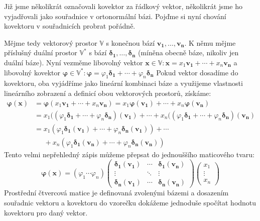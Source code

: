 \documentclass[a5paper,12pt]{amsbook}
\theoremstyle{definition}
\newcommand{\myvec}[1]{\mathbf{#1}}
\newcommand{\myspace}[1]{\mathbb{#1}}
\newcommand{\mydual}[1]{\myspace{#1^{*}}}
\begin{document}
\noindent
Již jsme několikrát označovali kovektor za řádkový vektor, několikrát jsme ho vyjadřovali jako
souřadnice v ortonormální bázi. Pojďme si nyní chování kovektoru v souřadnicích probrat pořádně.

Mějme tedy vektorový prostor $\myspace{V}$ s konečnou bází ${\myvec{v_1}, \hdots , \myvec{v_n}}$.
K němu mějme příslušný duální prostor $\mydual{V}$ s bází
${\myvec{\delta_1}, \hdots , \myvec{\delta_n}}$ (míněna obecně báze, nikoliv jen duální báze).
Nyní vezměme libovolný vektor
$\myvec{x}\in\myspace{V}: \myvec{x} = x_1\myvec{v_1} + \cdots + x_n\myvec{v_n}$
a libovolný kovektor
$\myvec{\varphi}\in\mydual{V}: \myvec{\varphi} = \varphi_1\myvec{\delta_1} + \cdots + \varphi_n\myvec{\delta_n}$
Pokud vektor dosadíme do kovektoru, oba vyjádříme jako lineární kombinaci báze a využijeme
vlastnosti lineárního zobrazení a definicí obou vektorových prostorů, získáme:
\begin{equation*}
\begin{split}
\myvec{\varphi}(\myvec{x}) &= \myvec{\varphi}(x_1\myvec{v_1} + \cdots + x_n\myvec{v_n})
     = x_1\myvec{\varphi}(\myvec{v_1}) + \cdots + x_n\myvec{\varphi}(\myvec{v_n}) \\
    &= x_1((\varphi_1\myvec{\delta_1} + \cdots + \varphi_n\myvec{\delta_n})(\myvec{v_1}) + \cdots
       + x_n((\varphi_1\myvec{\delta_1} + \cdots + \varphi_n\myvec{\delta_n})(\myvec{v_n}) \\
    &= x_1(\varphi_1\myvec{\delta_1}(\myvec{v_1}) + \cdots + \varphi_n\myvec{\delta_n}(\myvec{v_1})) 
    + \cdots \\
    & \;\;\;\;\; + x_n(\varphi_1\myvec{\delta_1}(\myvec{v_n}) + \cdots + \varphi_n\myvec{\delta_n}(\myvec{v_n}))
\end{split}
\end{equation*}
Tento velmi nepřehledný zápis můžeme přepsat do jednouššího maticového tvaru:
\begin{equation*}
\myvec{\varphi}(\myvec{x}) = \left(\varphi_1 \cdots \varphi_n\right)
\left(\begin{array}{ccc}
\myvec{\delta_1}(\myvec{v_1}) & \cdots & \myvec{\delta_1}(\myvec{v_n}) \\
\vdots & \ddots & \vdots \\
\myvec{\delta_n}(\myvec{v_1}) & \cdots & \myvec{\delta_n}(\myvec{v_n})
\end{array}\right)\left(\begin{array}{c}x_1 \\ \vdots \\ x_n\end{array}\right)
\end{equation*}
Prostřední čtvercová matice je definovaná zvolenými bázemi a dosazením souřadnic
vektoru a kovektoru do vzorečku dokážeme jednoduše spočítat hodnotu kovektoru
pro daný vektor.
\end{document}
